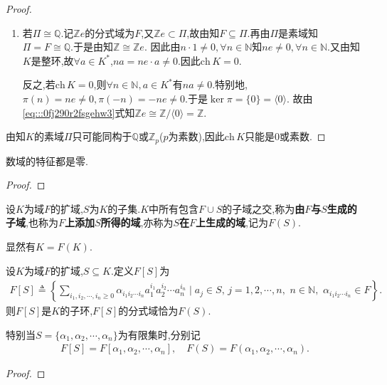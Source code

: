 \documentclass[../../main.tex]{subfiles}%
\begin{document}
\begin{proof}
\begin{enumerate}[(1)]
\item 若$\Pi \cong \mathbb{Q}$.记$\mathbb{Z}e$的分式域为$F$,又$\mathbb{Z}e\subset \Pi$,故由知$F\subseteq \Pi$.再由$\Pi$是素域知$\Pi=F\cong \mathbb{Q}$.于是由知$\mathbb{Z}\cong\mathbb{Z}e$.
因此由$n\cdot 1\neq 0,\forall n\in \mathbb{N}$知$ne\neq0,\forall n\in\mathbb{N}$.又由知$K$是整环,故$\forall a\in K^*$,$na=ne\cdot a\neq0$.因此$\mathrm{ch}\,K=0$.

反之,若$\mathrm{ch}\,K=0$,则$\forall n\in\mathbb{N},a\in K^*$有$na\neq0$.特别地,$\pi(n)=ne\neq0,\pi(-n)=-ne\neq 0$.于是$\ker \pi =\{0\}=\langle0\rangle$.
故由\eqref{eq:::0fj290r2fsgehw3}式知$\mathbb{Z}e\cong\mathbb{Z}/\langle0\rangle=\mathbb{Z}$.
\end{enumerate}
由知$K$的素域$\Pi$只可能同构于$\mathbb{Q}$或$\mathbb{Z}_p$($p$为素数),因此$\mathrm{ch}\,K$只能是$0$或素数.

\end{proof}

\begin{corollary}\label{corollary:数域的特征都是零}
数域的特征都是零.
\end{corollary}
\begin{proof}



\end{proof}

\begin{definition}
设$K$为域$F$的扩域,$S$为$K$的子集.$K$中所有包含$F\cup S$的子域之交,称为\textbf{由$F$与$S$生成的子域},也称为\textbf{$F$上添加$S$所得的域},亦称为\textbf{$S$在$F$上生成的域},记为$F(S)$.
\end{definition}
\begin{remark}
显然有$K=F(K)$.
\end{remark}

\begin{theorem}\label{theorem:F上添加S生成的域就是FS的分式域}
设$K$为域$F$的扩域,$S\subseteq K$.定义$F[S]$为
\begin{align*}
F[S]\triangleq \left\{ \sum_{i_1,i_2,\cdots ,i_n\geqslant 0}{\alpha _{i_1i_2\cdots i_n}a_{1}^{i_1}a_{2}^{i_2}}\cdots a_{n}^{i_n}\mid a_j\in S,\,j=1,2,\cdots ,n,\,\,n\in \mathbb{N},\,\,\alpha _{i_1i_2\cdots i_n}\in F \right\}.
\end{align*}
则$F[S]$是$K$的子环,$F[S]$的分式域恰为$F(S)$.

特别当$S=\{\alpha_1,\alpha_2,\cdots,\alpha_n\}$为有限集时,分别记
\begin{align*}
F[S]=F[\alpha_1,\alpha_2,\cdots,\alpha_n],\quad F(S)=F(\alpha_1,\alpha_2,\cdots,\alpha_n).
\end{align*}
\end{theorem}
\begin{proof}



\end{proof}
\end{document}

